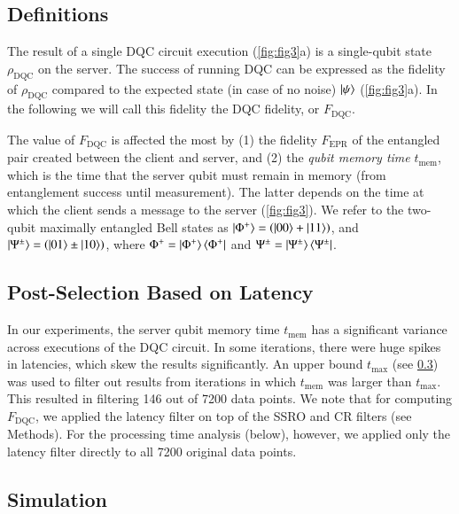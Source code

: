 \subsection{Definitions}

The result of a single \ac{DQC} circuit execution (\cref{fig:fig3}a) is a single-qubit state $\rho_{\text{DQC}}$ on the server. The success of running \ac{DQC} can be expressed as the fidelity of $\rho_{\text{DQC}}$ compared to the expected state (in case of no noise) $\ket{\psi}$ (\cref{fig:fig3}a). In the following we will call this fidelity the \ac{DQC} fidelity, or $F_{\text{DQC}}$.

The value of $F_{\text{DQC}}$ is affected the most by (1) the fidelity $F_{\text{EPR}}$ of the entangled pair created between the client and server, and (2) the \textit{qubit memory time} $t_{\text{mem}}$, which is the time that the server qubit must remain in memory (from entanglement success until measurement). The latter depends on the time at which the client sends a message to the server (\cref{fig:fig3}). We refer to the two-qubit maximally entangled Bell states as $\ket{\Phi^+} = \left(\ket{00} + \ket{11}\right)$, and $\ket{\Psi^{\pm}} = \left(\ket{01} \pm \ket{10}\right)$, where $\Phi^+ = \ket{\Phi^+}\bra{\Phi^+}$ and $\Psi^{\pm} = \ket{\Psi^{\pm}}\bra{\Psi^{\pm}}$.

\subsection{Post-Selection Based on Latency}
\label{qnodeos:sec:post-selection-latency}

In our experiments, the server qubit memory time $t_{\text{mem}}$ has a significant variance across executions of the \ac{DQC} circuit. In some iterations, there were huge spikes in latencies, which skew the results significantly. An upper bound $t_{\max}$ (see \cref{qnodeos:sec:dqc-simulation}) was used to filter out results from iterations in which $t_{\text{mem}}$ was larger than $t_{\max}$. This resulted in filtering 146 out of 7200 data points. We note that for computing $F_{\text{DQC}}$, we applied the latency filter on top of the \ac{SSRO} and \ac{CR} filters (see Methods). For the processing time analysis (below), however, we applied only the latency filter directly to all 7200 original data points.

\subsection{Simulation}
\label{qnodeos:sec:dqc-simulation}

